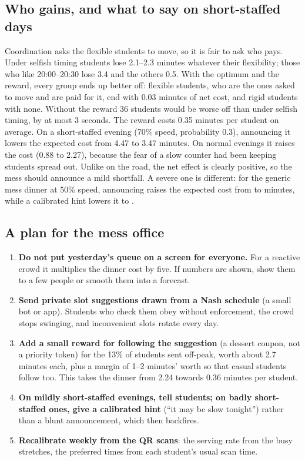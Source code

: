 \documentclass{article}
\begin{document}
\subsection{Who gains, and what to say on short-staffed days}
Coordination asks the flexible students to move, so it is fair to ask who pays. Under selfish timing students lose
2.1--2.3 minutes whatever their flexibility; those who like 20:00--20:30 lose 3.4 and the others 0.5. With the optimum and the reward, every group ends up
better off: flexible students, who are the ones asked to move and are paid for it, end with 0.03 minutes of net cost,
and rigid students with none. Without the reward 36 students would be worse off than under selfish timing, by at most
3 seconds. The reward costs 0.35 minutes per student on average. On a short-staffed evening (70\% speed, probability
0.3), announcing it lowers the expected cost from 4.47 to 3.47 minutes. On normal evenings it raises the cost (0.88 to
2.27), because the fear of a slow counter had been keeping students spread out. Unlike on the road, the net effect is
clearly positive, so the mess should announce a mild shortfall. A severe one is different: for the generic mess dinner
at 50\% speed, announcing raises the expected cost from \MessFiftyNobody{} to \MessFiftyAnn{} minutes, while a calibrated hint lowers it to
\MessFiftyHint.

\subsection{A plan for the mess office}
\begin{enumerate}
\item \textbf{Do not put yesterday's queue on a screen for everyone.} For a reactive crowd it multiplies the dinner
cost by five. If numbers are shown, show them to a few people or smooth them into a forecast.
\item \textbf{Send private slot suggestions drawn from a Nash schedule} (a small bot or app). Students who check them
obey without enforcement, the crowd stops swinging, and inconvenient slots rotate every day.
\item \textbf{Add a small reward for following the suggestion} (a dessert coupon, not a priority token) for the 13\% of
students sent off-peak, worth about 2.7 minutes each, plus a margin of 1--2 minutes' worth so that casual students
follow too. This takes the dinner from 2.24 towards 0.36 minutes per student.
\item \textbf{On mildly short-staffed evenings, tell students; on badly short-staffed ones, give a calibrated hint}
(``it may be slow tonight'') rather than a blunt announcement, which then backfires.
\item \textbf{Recalibrate weekly from the QR scans}: the serving rate from the busy stretches, the preferred times from
each student's usual scan time.
\end{enumerate}
\end{document}
